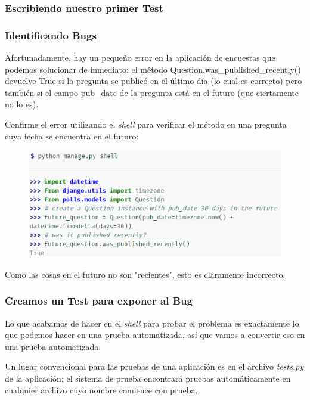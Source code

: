 \documentclass[10pt]{article}
\begin{document}
\subsubsection{Escribiendo nuestro primer Test}
\subsubsection*{Identificando Bugs}
Afortunadamente, hay un pequeño error en la aplicación de encuestas que podemos solucionar de inmediato: el método \textcolor{G}{Question.was\_published\_recently()} devuelve \textcolor{R}{True} si la pregunta se publicó en el último día (lo cual es correcto) pero también si el campo \textcolor{G}{pub\_date} de la pregunta está en el futuro (que ciertamente no lo es).

Confirme el error utilizando el \textit{shell} para verificar el método en una pregunta cuya fecha se encuentra en el futuro:

\begin{figure}[H]
\begin{center}
\includegraphics[scale=1]{figuras/3/35/352/img1.png}
\end{center}
\end{figure}

Como las cosas en el futuro no son "recientes", esto es claramente incorrecto.

\subsubsection*{Creamos un Test para exponer al Bug}

Lo que acabamos de hacer en el \textit{shell} para probar el problema es exactamente lo que podemos hacer en una prueba automatizada, así que vamos a convertir eso en una prueba automatizada.

Un lugar convencional para las pruebas de una aplicación es en el archivo \textit{tests.py} de la aplicación; el sistema de prueba encontrará pruebas automáticamente en cualquier archivo cuyo nombre comience con prueba.
\end{document}
